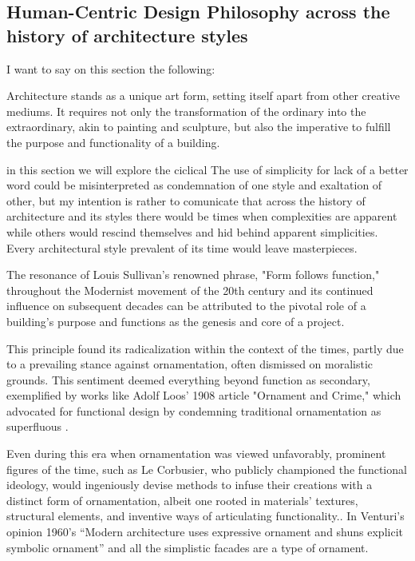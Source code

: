 \subsection{Human-Centric Design Philosophy across the history of architecture styles}
\label{subsec:TimelineArchitectureStyles}


I want to say on this section the following:

Architecture stands as a unique art form, setting itself apart from other creative mediums.
It requires not only the transformation of the ordinary into the extraordinary, akin to painting and sculpture, but also the imperative to fulfill the purpose and functionality of a building\cite{Hnin2022}.

in this section we will explore the ciclical The use of simplicity for lack of a better word could be misinterpreted as condemnation of one style and exaltation of other, but my intention is rather to comunicate that across the history of architecture and its styles there would be times when complexities are apparent while others would rescind themselves and hid behind apparent simplicities. Every architectural style prevalent of its time would leave masterpieces.


The resonance of Louis Sullivan's renowned phrase, "Form follows function," throughout the Modernist movement of the 20th century and its continued influence on subsequent decades can be attributed to the pivotal role of a building's purpose and functions as the genesis and core of a project\cite{Hnin2022}.

This principle found its radicalization within the context of the times, partly due to a prevailing stance against ornamentation, often dismissed on moralistic grounds.
This sentiment deemed everything beyond function as secondary, exemplified by works like Adolf Loos' 1908 article "Ornament and Crime," which advocated for functional design by condemning traditional ornamentation as superfluous \cite{Saglam2014}.

Even during this era when ornamentation was viewed unfavorably, prominent figures of the time, such as Le Corbusier, who publicly championed the functional ideology, would ingeniously devise methods to infuse their creations with a distinct form of ornamentation, albeit one rooted in materials' textures, structural elements, and inventive ways of articulating functionality.\cite{Saglam2014}.
In Venturi's opinion \cite{venturi1972} 1960's ``Modern architecture uses expressive ornament and shuns explicit symbolic  ornament'' and all the simplistic facades are a type of ornament.



